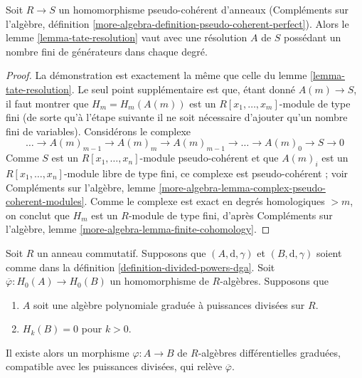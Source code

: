 \begin{lemma}
\label{lemma-tate-resoluton-pseudo-coherent-ring-map}
Soit $R \to S$ un homomorphisme pseudo-cohérent d'anneaux (Compléments sur l'algèbre, définition
\ref{more-algebra-definition-pseudo-coherent-perfect}). Alors le
lemme \ref{lemma-tate-resolution} vaut avec une résolution $A$ de $S$
possédant un nombre fini de générateurs dans chaque degré.
\end{lemma}

\begin{proof}
La démonstration est exactement la même que celle du lemme \ref{lemma-tate-resolution}. Le
seul point supplémentaire est que, étant donné $A(m) \to S$, il faut
montrer que $H_m = H_m(A(m))$ est un $R[x_1, \ldots, x_m]$-module de
type fini (de sorte qu'à l'étape suivante il ne soit nécessaire d'ajouter qu'un nombre fini de
variables). Considérons le complexe
$$
\ldots\to A(m)_{m - 1} \to A(m)_m \to A(m)_{m - 1} \to
\ldots\to A(m)_0 \to S \to 0
$$
Comme $S$ est un $R[x_1, \ldots, x_n]$-module
pseudo-cohérent et que $A(m)_i$ est un $R[x_1, \ldots, x_n]$-module
libre de type fini, ce complexe est pseudo-cohérent ; voir
Compléments sur l'algèbre, lemme \ref{more-algebra-lemma-complex-pseudo-coherent-modules}.
Comme le complexe est exact en degrés homologiques $> m$,
on conclut que $H_m$ est un $R$-module de type
fini, d'après Compléments sur l'algèbre, lemme \ref{more-algebra-lemma-finite-cohomology}.
\end{proof}

\begin{lemma}
\label{lemma-uniqueness-tate-resolution}
Soit $R$ un anneau commutatif. Supposons que $(A, \text{d}, \gamma)$ et
$(B, \text{d}, \gamma)$ soient comme
dans la définition \ref{definition-divided-powers-dga}.
Soit $\overline{\varphi} : H_0(A) \to H_0(B)$ un homomorphisme de $R$-algèbres.
Supposons que
\begin{enumerate}
\item $A$ soit une algèbre polynomiale graduée à puissances divisées sur $R$.
\item $H_k(B) = 0$ pour $k > 0$.
\end{enumerate}
Il existe alors un morphisme $\varphi : A \to B$ de
$R$-algèbres différentielles graduées, compatible avec les puissances
divisées, qui relève $\overline{\varphi}$.
\end{lemma}

